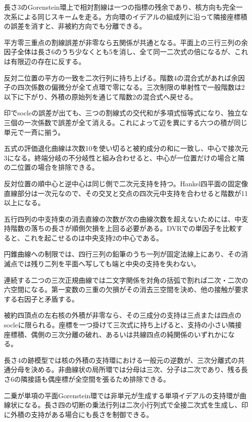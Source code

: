 \documentclass[11pt,a4paper]{ltjsarticle}
\begin{document}
長さ3のGorenstein環上で相対割線は一つの指標の残余であり、核方向も完全一次系による同じスキームを走る。方向環のイデアルの組成列に沿って隣接座標積の誤差を消すと、非被約方向でも分離できる。

平方零三重点の割線誤差が非零なら五関係が共通となる。平面上の三行三列の余因子全体は長さ6のうち少なくとも5を消し、全て同一二次式の倍になるが、これは有限辺の存在に反する。

反対二位置の平方の一致を二次行列に持ち上げる。階数4の混合式があれば余因子の四次係数の偏微分が全て点環で零になる。三次制限の単射性で一般階数は2以下に下がり、外積の原始列を通じて階数2の混合式へ戻せる。

印でsocleの誤差が出ても、三つの割線式の交代和が多項式恒等式になり、独立な三個の一次係数で誤差が全て消える。これによって辺を異にする六つの積が同じ単元で一斉に揃う。

五式の評価退化曲線は次数10を使い切ると被約成分の和に一致し、中心で接次元3になる。終端分岐の不分岐性と組み合わせると、中心が一位置だけの場合と隣の二位置の場合を排除できる。

反対位置の順中心と逆中心は同じ側で二次元支持を持つ。Hankel四平面の固定像直線部分は一次元なので、その交叉と交点の四次元中支持を合わせると階数が11以上になる。

五行四列の中支持束の消去直線の次数が次の曲線次数を超えないためには、中支持階数の落ちの長さが順側欠損を上回る必要がある。DVRでの単因子を比較すると、これを起こせるのは中央支持2の中心である。

円錐曲線への制限では、四行三列の鉛筆のうち一列が固定法線上にあり、その消滅点では残り二列を平面へ写しても端と中央の支持を失わない。

連続する二つの三次正規曲線では二文字関係を対角の括弧で割れば二次・二次の六空間になる。第一変数の三重の欠損がその消去三空間を決め、他の接触が要求する右因子と矛盾する。

被約四頂点の左右核の外積が非零なら、その三成分の支持は三点または四点のsocleに限られる。座標を一つ掛けて三次式に持ち上げると、支持の小さい隣接座標積、偶側の三次分離の破れ、あるいは共線四点の純関係のいずれかになる。

長さ4の跡模型では核の外積の支持環における一般元の逆数が、三次分離式の共通分母を決める。非曲線状の局所環では分母は三次、分子は二次であり、残る長さ6の隣接語も偶座標が全空間を張るため排除できる。

二乗が単項の平面Gorenstein環では非単元が生成する単項イデアルの支持環が曲線状になる。長さ四の切断の乗法行列は二次小行列式で全接二次式を生成し、印に外積の支持がある場合にも長さを制御できる。
\end{document}
